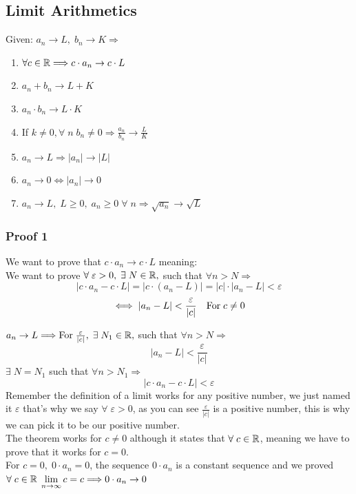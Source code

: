 \subsection{Limit Arithmetics}
Given: $a_n\rightarrow L,\; b_n\rightarrow K\Longrightarrow$
\begin{enumerate}
    \item $\forall c\in \mathbb{R}\Longrightarrow c\cdot a_n \rightarrow c\cdot L$
    \item $a_n+b_n\rightarrow L+K$
    \item $a_n\cdot b_n\rightarrow L\cdot K$
    \item If $k\neq0,\forall\; n\; b_n\neq 0 \Longrightarrow \frac{a_n}{b_n}\rightarrow \frac{L}{K}$
    \item $a_n\rightarrow L \Longrightarrow |a_n|\rightarrow |L|$
    \item $a_n\rightarrow 0 \iff |a_n|\rightarrow 0$
    \item $a_n\rightarrow L,\; L\geq 0,\; a_n\geq 0\; \forall\; n\Longrightarrow \sqrt{a_n}\rightarrow \sqrt{L}$
\end{enumerate}
\subsubsection{Proof 1}
We want to prove that $c\cdot a_n\rightarrow c\cdot L$ meaning:\\
We want to prove $\forall\; \varepsilon>0,\; \exists\; N\in \mathbb{R},$ such that $\forall n>N\Longrightarrow$\\
\[
    |c\cdot a_n-c\cdot L|=|c\cdot(a_n-L)| = |c|\cdot|a_n-L|<\varepsilon
\]
\[
    \iff |a_n-L|<\frac{\varepsilon}{|c|} \quad \text{For\;} c\neq 0
\]
 
$a_n\rightarrow L\Longrightarrow \text{For}\; \frac{\varepsilon}{|c|},\; \exists\; N_1\in \mathbb{R},$ such that $\forall n>N\Longrightarrow$
\[
    |a_n-L|<\frac{\varepsilon}{|c|}
\]
$\exists\; N=N_1$ such that $\forall n>N_1\Longrightarrow$
\[
    |c\cdot a_n-c\cdot L|<\varepsilon
\]
Remember the definition of a limit works for any positive number, we just named it $\varepsilon$ that's why we say $\forall\; \varepsilon>0$, as you can see $\frac{\varepsilon}{|c|}$ is a positive number, this is why we can pick it to be our positive number.\\
The theorem works for $c\neq 0$ although it states that $\forall\; c\in \mathbb{R}$, meaning we have to prove that it works for $c=0$.\\
For $c=0,\; 0\cdot a_n = 0$, the sequence $0\cdot a_n$ is a constant sequence and we proved $\forall\; c\in \R\; \lim_{n\to\infty} c = c \Longrightarrow 0\cdot a_n \rightarrow 0$\\

